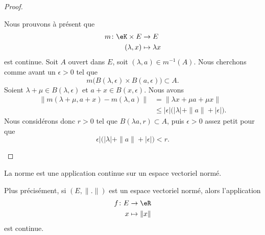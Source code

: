 \begin{proof}
\begin{subproof}
		Nous prouvons à présent que
		\begin{equation}
			\begin{aligned}
				m\colon \eK\times E & \to E             \\
				(\lambda,x)         & \mapsto \lambda x
			\end{aligned}
		\end{equation}
		est continue. Soit \( A\) ouvert dans \( E\), soit \( (\lambda, a)\in m^{-1}(A)\). Nous cherchons comme avant un \( \epsilon>0\) tel que
		\begin{equation}
			m\big( B(\lambda,\epsilon)\times B(a,\epsilon) \big)\subset A.
		\end{equation}
		Soient \( \lambda+\mu\in B(\lambda,\epsilon)\) et \( a+x\in B(x,\epsilon)\). Nous avons
		\begin{subequations}
			\begin{align}
				\| m(\lambda+\mu,a+x)- m(\lambda,a) \| & =\| \lambda x+\mu a+\mu x \|                                   \\
				                                       & \leq | \epsilon |\big( | \lambda |+\| a \|+| \epsilon | \big).
			\end{align}
		\end{subequations}
		Nous considérons donc \( r>0\) tel que \( B(\lambda a, r)\subset A\), puis \( \epsilon>0\) assez petit pour que
		\begin{equation}
			\epsilon |\big( | \lambda |+\| a \|+| \epsilon | \big)<r.
		\end{equation}
	\end{subproof}
\end{proof}

\begin{proposition}     \label{PROPooYMCUooERvDpk}
	La norme est une application continue sur un espace vectoriel normé.

	Plus précisément, si \( (E,\| . \|)\) est un espace vectoriel normé, alors l'application
	\begin{equation}
		\begin{aligned}
			f\colon E & \to \eR         \\
			x         & \mapsto \| x \|
		\end{aligned}
	\end{equation}
	est continue.
\end{proposition}

